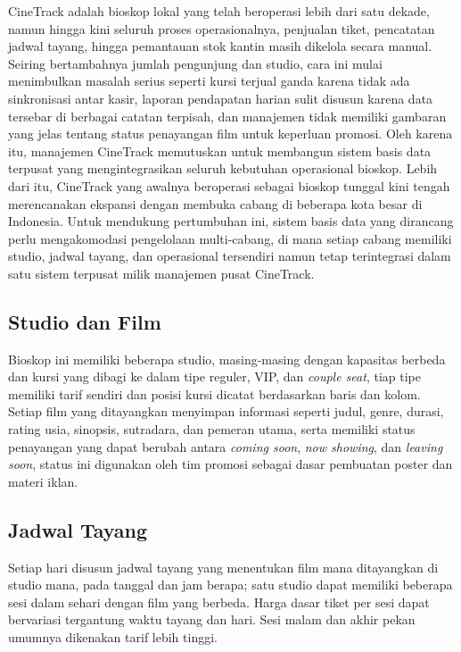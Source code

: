 \documentclass[letter,12pt,bahasa]{article}
\begin{document}
CineTrack adalah bioskop lokal yang telah beroperasi lebih dari satu dekade, namun hingga kini seluruh proses operasionalnya, penjualan tiket, pencatatan jadwal tayang, hingga pemantauan stok kantin masih dikelola secara manual. Seiring bertambahnya jumlah pengunjung dan studio, cara ini mulai menimbulkan masalah serius seperti kursi terjual ganda karena tidak ada sinkronisasi antar kasir, laporan pendapatan harian sulit disusun karena data tersebar di berbagai catatan terpisah, dan manajemen tidak memiliki gambaran yang jelas tentang status penayangan film untuk keperluan promosi. Oleh karena itu, manajemen CineTrack memutuskan untuk membangun sistem basis data terpusat yang mengintegrasikan seluruh kebutuhan operasional bioskop. Lebih dari itu, CineTrack yang awalnya beroperasi sebagai bioskop tunggal kini tengah merencanakan ekspansi dengan membuka cabang di beberapa kota besar di Indonesia. Untuk mendukung pertumbuhan ini, sistem basis data yang dirancang perlu mengakomodasi pengelolaan multi-cabang, di mana setiap cabang memiliki studio, jadwal tayang, dan operasional tersendiri namun tetap terintegrasi dalam satu sistem terpusat milik manajemen pusat CineTrack.

\subsection{Studio dan Film}

Bioskop ini memiliki beberapa studio, masing-masing dengan kapasitas berbeda dan kursi yang dibagi ke dalam tipe reguler, VIP, dan \textit{couple seat}, tiap tipe memiliki tarif sendiri dan posisi kursi dicatat berdasarkan baris dan kolom. Setiap film yang ditayangkan menyimpan informasi seperti judul, genre, durasi, rating usia, sinopsis, sutradara, dan pemeran utama, serta memiliki status penayangan yang dapat berubah antara \textit{coming soon}, \textit{now showing}, dan \textit{leaving soon}, status ini digunakan oleh tim promosi sebagai dasar pembuatan poster dan materi iklan.

\subsection{Jadwal Tayang}

Setiap hari disusun jadwal tayang yang menentukan film mana ditayangkan di studio mana, pada tanggal dan jam berapa; satu studio dapat memiliki beberapa sesi dalam sehari dengan film yang berbeda. Harga dasar tiket per sesi dapat bervariasi tergantung waktu tayang dan hari. Sesi malam dan akhir pekan umumnya dikenakan tarif lebih tinggi.
\end{document}
